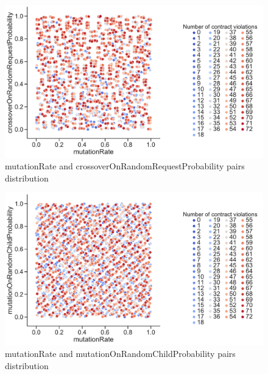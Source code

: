 \begin{figure}
	\centering
	\includegraphics[width=\textwidth]{images/PairsDistr/mutationRate_crossoverOnRandomRequestProbability.pdf}
	\caption[mutationRate and crossoverOnRandomRequestProbability pairs distribution]{mutationRate and crossoverOnRandomRequestProbability pairs distribution}
	\label{fig:mutationRate_crossoverOnRandomRequestProbability_pair}
\end{figure}
\begin{figure}
	\centering
	\includegraphics[width=\textwidth]{images/PairsDistr/mutationRate_mutationOnRandomChildProbability.pdf}
	\caption[mutationRate and mutationOnRandomChildProbability pairs distribution]{mutationRate and mutationOnRandomChildProbability pairs distribution}
	\label{fig:mutationRate_mutationOnRandomChildProbability_pair}
\end{figure}
